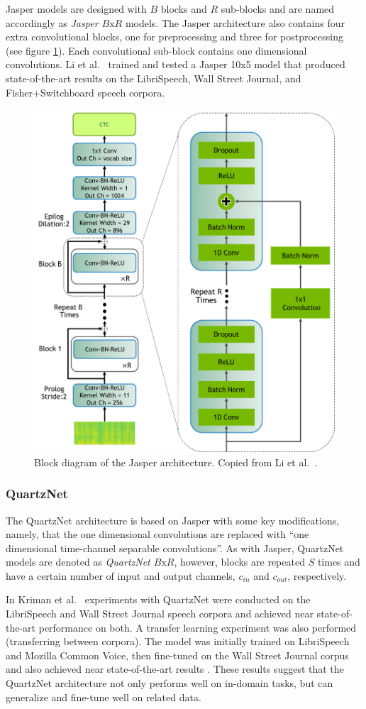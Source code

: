 \documentclass[12pt]{article}
\begin{document}
Jasper models are designed with $B$ blocks and $R$ sub-blocks and are named accordingly as \textit{Jasper $B\mbox{x}R$} models. The Jasper
architecture also contains four extra convolutional blocks, one for preprocessing and three for postprocessing (see figure \ref{fig:jasper}). Each
convolutional sub-block contains one dimensional convolutions. Li et al.~\cite{li_jasper_2019} trained and tested a Jasper 10x5 model that produced
state-of-the-art results on the LibriSpeech, Wall Street Journal, and Fisher+Switchboard speech corpora.

\begin{figure}
    \centering
    \includegraphics[width=0.5\linewidth]{figures/jasper_vertical.png}
    \caption{Block diagram of the Jasper architecture. Copied from Li et al.~\cite{li_jasper_2019}.}
    \label{fig:jasper}
\end{figure}

\subsubsection{QuartzNet}\label{sec:quartznet}
The QuartzNet architecture is based on Jasper with some key modifications, namely, that the one dimensional convolutions are replaced with ``one
dimensional time-channel separable convolutions''. As with Jasper, QuartzNet models are denoted as \textit{QuartzNet $B\mbox{x}R$}, however, blocks
are repeated $S$ times and have a certain number of input and output channels, $c_{in}$ and $c_{out}$, respectively.

In Kriman et al.~\cite{kriman_quartznet_2020} experiments with QuartzNet were conducted on the LibriSpeech and Wall Street Journal speech corpora and
achieved near state-of-the-art performance on both. A transfer learning experiment was also performed (transferring between corpora). The model was
initially trained on LibriSpeech and Mozilla Common Voice, then fine-tuned on the Wall Street Journal corpus and also achieved near state-of-the-art
results \cite{kriman_quartznet_2020}. These results suggest that the QuartzNet architecture not only performs well on in-domain tasks, but can
generalize and fine-tune well on related data.
\end{document}
